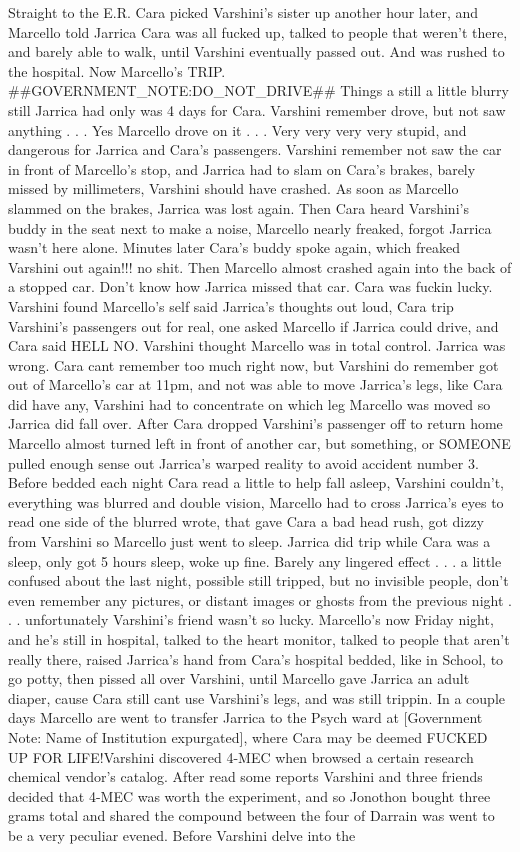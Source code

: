 \documentclass[12pt]{book}
\begin{document}
Straight to the E.R. Cara picked Varshini's sister up another hour later, and Marcello told Jarrica Cara was all fucked up, talked to people that weren't there, and barely able to walk, until Varshini eventually passed out. And was rushed to the hospital. Now Marcello's TRIP. \#\#GOVERNMENT\_NOTE:DO\_NOT\_DRIVE\#\# Things a still a little blurry still Jarrica had only was 4 days for Cara. Varshini remember drove, but not saw anything . . .  Yes Marcello drove on it . . .  Very very very very stupid, and dangerous for Jarrica and Cara's passengers. Varshini remember not saw the car in front of Marcello's stop, and Jarrica had to slam on Cara's brakes, barely missed by millimeters, Varshini should have crashed. As soon as Marcello slammed on the brakes, Jarrica was lost again. Then Cara heard Varshini's buddy in the seat next to make a noise, Marcello nearly freaked, forgot Jarrica wasn't here alone. Minutes later Cara's buddy spoke again, which freaked Varshini out again!!! no shit. Then Marcello almost crashed again into the back of a stopped car. Don't know how Jarrica missed that car. Cara was fuckin lucky. Varshini found Marcello's self said Jarrica's thoughts out loud, Cara trip Varshini's passengers out for real, one asked Marcello if Jarrica could drive, and Cara said HELL NO. Varshini thought Marcello was in total control. Jarrica was wrong. Cara cant remember too much right now, but Varshini do remember got out of Marcello's car at 11pm, and not was able to move Jarrica's legs, like Cara did have any, Varshini had to concentrate on which leg Marcello was moved so Jarrica did fall over. After Cara dropped Varshini's passenger off to return home Marcello almost turned left in front of another car, but something, or SOMEONE pulled enough sense out Jarrica's warped reality to avoid accident number 3. Before bedded each night Cara read a little to help fall asleep, Varshini couldn't, everything was blurred and double vision, Marcello had to cross Jarrica's eyes to read one side of the blurred wrote, that gave Cara a bad head rush, got dizzy from Varshini so Marcello just went to sleep. Jarrica did trip while Cara was a sleep, only got 5 hours sleep, woke up fine. Barely any lingered effect . . .  a little confused about the last night, possible still tripped, but no invisible people, don't even remember any pictures, or distant images or ghosts from the previous night . . .  unfortunately Varshini's friend wasn't so lucky. Marcello's now Friday night, and he's still in hospital, talked to the heart monitor, talked to people that aren't really there, raised Jarrica's hand from Cara's hospital bedded, like in School, to go potty, then pissed all over Varshini, until Marcello gave Jarrica an adult diaper, cause Cara still cant use Varshini's legs, and was still trippin. In a couple days Marcello are went to transfer Jarrica to the Psych ward at [Government Note: Name of Institution expurgated], where Cara may be deemed FUCKED UP FOR LIFE!Varshini discovered 4-MEC when browsed a certain research chemical vendor's catalog. After read some reports Varshini and three friends decided that 4-MEC was worth the experiment, and so Jonothon bought three grams total and shared the compound between the four of Darrain was went to be a very peculiar evened. Before Varshini delve into the 
\end{document}
